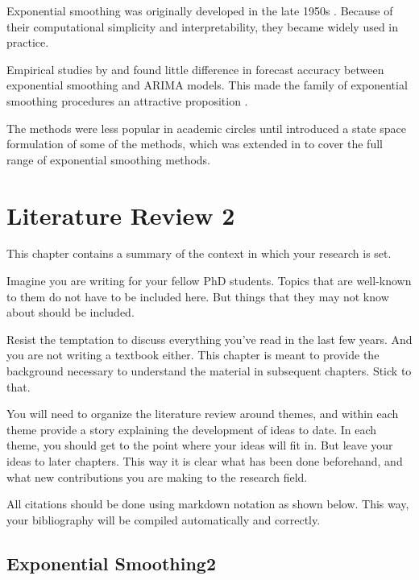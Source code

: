 \documentclass{sydneythesis}
\begin{document}
Exponential smoothing was originally developed in the late 1950s \autocite{Brown59,Brown63,Holt57,Winters60}. Because of their computational simplicity and interpretability, they became widely used in practice.

Empirical studies by \textcite{MH79} and \textcite{Metal82} found little difference in forecast accuracy between exponential smoothing and ARIMA models. This made the family of exponential smoothing procedures an attractive proposition \autocite[see][]{CKOS01}.

The methods were less popular in academic circles until \textcite{OKS97} introduced a state space formulation of some of the methods, which was extended in \textcite{HKSG02} to cover the full range of exponential smoothing methods.

\hypertarget{ch:litreview2}{%
\chapter{Literature Review 2}\label{ch:litreview2}}

This chapter contains a summary of the context in which your research is set.

Imagine you are writing for your fellow PhD students. Topics that are well-known to them do not have to be included here. But things that they may not know about should be included.

Resist the temptation to discuss everything you've read in the last few years. And you are not writing a textbook either. This chapter is meant to provide the background necessary to understand the material in subsequent chapters. Stick to that.

You will need to organize the literature review around themes, and within each theme provide a story explaining the development of ideas to date. In each theme, you should get to the point where your ideas will fit in. But leave your ideas to later chapters. This way it is clear what has been done beforehand, and what new contributions you are making to the research field.

All citations should be done using markdown notation as shown below. This way, your bibliography will be compiled automatically and correctly.

\hypertarget{sec:expsmooth2}{%
\section{Exponential Smoothing2}\label{sec:expsmooth2}}
\end{document}
